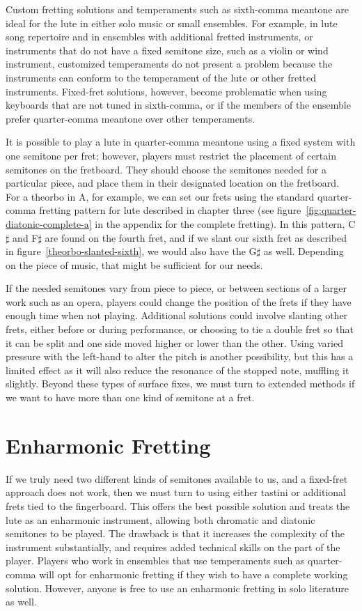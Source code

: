 Custom fretting solutions and temperaments such as sixth-comma meantone are ideal
for the lute in either solo music or small ensembles.  For example, in lute song
repertoire and in ensembles with additional fretted instruments, or instruments that do not
have a fixed semitone size, such as a violin or wind instrument, customized temperaments
do not present a problem because the instruments can conform to the temperament of
the lute or other fretted instruments. Fixed-fret solutions, however, become
problematic when using keyboards that are not tuned in sixth-comma, or if the members
of the ensemble prefer quarter-comma meantone over other temperaments.

It is possible to play a lute in quarter-comma meantone using a fixed system with one semitone per
fret; however, players must restrict the placement of certain semitones
on the fretboard.  They should choose the semitones needed for a particular
piece, and place them in their designated location on the fretboard.  For a theorbo
in A, for example, we can set our frets using the standard quarter-comma fretting
pattern for lute described in chapter three (see figure~\ref{fig:quarter-diatonic-complete-a}
in the appendix for the complete fretting).  In this pattern, C$\sharp$ and F$\sharp$
are found on the fourth fret, and if we slant our sixth fret as described in
figure~\ref{theorbo-slanted-sixth}, we would also have the G$\sharp$ as well. Depending
on the piece of music, that might be sufficient for our needs.

If the needed semitones vary from piece to piece, or between sections of a larger work
such as an opera, players could change the position of the frets if they have enough
time when not playing. Additional solutions could involve slanting
other frets, either before or during performance, or choosing to tie a double fret so
that it can be split and one side moved higher or lower than the other. Using varied
pressure with the left-hand to alter the pitch is another possibility, but this
has a limited effect as it will also reduce the resonance of the stopped note, muffling
it slightly. Beyond these types of surface fixes, we must turn to extended methods if
we want to have more than one kind of semitone at a fret.

\section{Enharmonic Fretting}

If we truly need two different kinds of semitones available to us, and a fixed-fret
approach does not work, then we must turn to using either tastini or additional frets
tied to the fingerboard.  This offers the best possible solution and treats the lute as
an enharmonic instrument, allowing both chromatic and diatonic semitones to be
played. The drawback is that it increases the complexity of the instrument substantially,
and requires added technical skills on the part of the player. Players who work in
ensembles that use temperaments such as quarter-comma will opt for enharmonic fretting
if they wish to have a complete working solution. However, anyone is free to use an
enharmonic fretting in solo literature as well.

